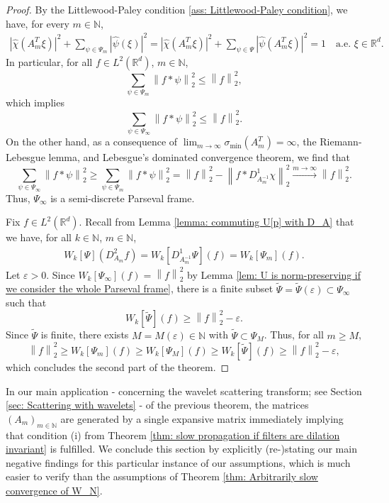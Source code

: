 \documentclass[11pt]{amsart}
\newcommand{\R}{{\mathbb{R}}}
\newcommand{\N}{\mathbb{N}}
\newcommand{\norm}[1]{\ensuremath{\left\lVert\text{}#1\text{}\right\rVert}}
\newenvironment{proof sketch} {\textit{Proof sketch.}}{}
\begin{document}
  \begin{proof}
    By the Littlewood-Paley condition \eqref{ass: Littlewood-Paley condition}, we have, for every $m \in \N$, 
    \begin{align*}
      |\hat{\chi}(A_m^{T}\xi)|^2+\sum_{\psi \in \Psi_m} |\hat{\psi}(\xi)|^2 = |\hat{\chi}(A_m^{T}\xi)|^2+\sum_{\psi \in \Psi} |\hat{\psi}(A_m^{T}\xi)|^2=1 \quad \text{a.e. } \xi \in \R^d.
    \end{align*}
    In particular, for all $f \in L^2(\R^d)$, $m \in \N$, 
    \[\sum_{\psi \in \Psi_m} \norm{f*\psi}_2^2  \leq \norm{f}_2^2,\]  
    which implies 
    \[\sum_{\psi \in \Psi_\infty} \norm{f*\psi}_2^2\leq \norm{f}_2^2.\] 
    On the other hand, as a consequence of $\lim_{m \to \infty}\sigma_{\text{min}}(A_m^{T})=\infty$, the Riemann-Lebesgue lemma, and Lebesgue's dominated convergence theorem, we find that
    \[\sum_{\psi \in \Psi_\infty} \norm{f*\psi}_2^2 \geq \sum_{\psi \in \Psi_m} \norm{f*\psi}_2^2 = \norm{f}_2^2 - \norm{f*D_{A_m^{-1}}^1\chi}_2^2 \xrightarrow{m \to \infty} \norm{f}_2^2.\] 
    Thus, $\Psi_\infty$ is a semi-discrete Parseval frame.
  
    Fix $f \in L^2(\R^d)$. Recall from Lemma \ref{lemma: commuting U[p] with D_A} that we have, for all $k \in \N$, $m \in \N$, 
    \begin{align*}
      W_k[\Psi](D_{A_m}^2f)=W_k[D_{A_m^{-1}}^1\Psi](f)=W_k[\Psi_m](f).
    \end{align*}
    Let $\varepsilon>0$. Since $W_k[\Psi_\infty](f)=\norm{f}_2^2$ by Lemma \ref{lem: U is norm-preserving if we consider the whole Parseval frame}, there is a finite subset $\tilde{\Psi}=\tilde{\Psi}(\varepsilon)\subset \Psi_\infty$ such that 
    \[W_k[\widetilde{\Psi}](f)\geq \norm{f}_2^2-\varepsilon.\] 
    Since $\widetilde{\Psi}$ is finite, there exists $M=M(\varepsilon) \in \N$ with $\widetilde{\Psi} \subset \Psi_{M}$. Thus, for all $m \geq M$,
    \[\norm{f}_2^2\geq W_k[\Psi_{m}](f)\geq W_k[\Psi_{M}](f) \geq W_k[\widetilde{\Psi}](f) \geq \norm{f}_2^2-\varepsilon,\]
    which concludes the second part of the theorem.
  \end{proof}
  
  In our main application - concerning the wavelet scattering transform; see Section \ref{sec: Scattering with wavelets} - of the previous theorem, the matrices $(A_m)_{m \in \N}$ are generated by a single expansive matrix immediately implying that condition (i) from Theorem \ref{thm: slow propagation if filters are dilation invariant} is fulfilled.
  We conclude this section by explicitly \mbox{(re-)stating} our main negative findings for this particular instance of our assumptions, which is much easier to verify than the assumptions of Theorem \ref{thm: Arbitrarily slow convergence of W_N}.
  
\end{document}
